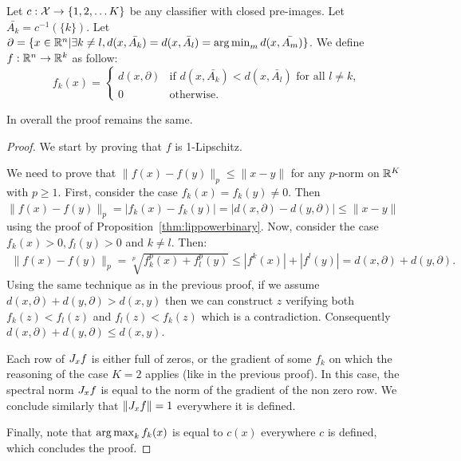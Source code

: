         \begin{definition}\label{def:nlckclasses}
            Let $c:\mathcal{X}\rightarrow\{1,2,\dots K\}$ be any classifier with closed pre-images. Let $\bar{A_k}=c^{-1}(\{k\})$. Let $\partial=\{x\in\mathbb{R}^n|\exists k\neq l, d(x,\bar{A_k})=d(x,\bar{A_l})=\operatorname*{arg\,min}_m d(x,\bar{A_m})\}$.    
            We define $f:\mathbb{R}^n\rightarrow\mathbb{R}^k$ as follow:
            \begin{equation}
                f_k(x)=\begin{cases}
                    d(x,\partial)& \text{if } d(x,\bar{A_k})<d(x,\bar{A_l})\text{ for all }l\neq k,\\
                    0&\text{otherwise}.
                \end{cases}
            \end{equation}
        \end{definition}
        
        In overall the proof remains the same.  
        
        \begin{proof}
            We start by proving that $f$ is \mbox{1-Lipschitz}.  
              
            We need to prove that $\|f(x)-f(y)\|_p\leq \|x-y\|$ for any $p$-norm on $\mathbb{R}^K$ with $p\geq 1$.  
            First, consider the case $f_k(x)=f_k(y)\neq 0$. Then $\|f(x)-f(y)\|_p=|f_k(x)-f_k(y)|=|d(x,\partial)-d(y,\partial)|\leq\|x-y\|$ using the proof of Proposition~\ref{thm:lippowerbinary}.     
            Now, consider the case $f_k(x)>0,f_l(y)>0$ and $k\neq l$. Then:  
            \begin{equation}
                \begin{split}
                    \|f(x)-f(y)\|_p =\sqrt[p]{f^p_k(x)+f^p_l(y)}\leq |f^k(x)|+|f^l(y)|=d(x,\partial)+d(y,\partial).
                \end{split}
            \end{equation}
            Using the same technique as in the previous proof, if we assume $d(x,\partial)+d(y,\partial)>d(x,y)$ then we can construct $z$ verifying both $f_k(z)<f_l(z)$ and $f_l(z)<f_k(z)$ which is a contradiction. Consequently $d(x,\partial)+d(y,\partial)\leq d(x,y)$.  
              
            Each row of $J_x f$ is either full of zeros, or the gradient of some $f_k$ on which the reasoning of the case $K=2$ applies (like in the previous proof). In this case, the spectral norm $J_x f$ is equal to the norm of the gradient of the non zero row. We conclude similarly that $\|J_x f\|=1$ everywhere it is defined.
              
            Finally, note that $\operatorname*{arg\,max}_k f_k(x)$ is equal to $c(x)$ everywhere $c$ is defined, which concludes the proof.  
        \end{proof}  
          
